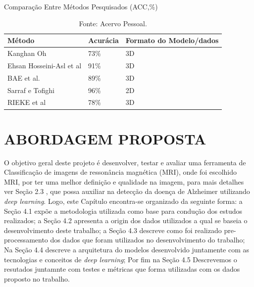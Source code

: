 \documentclass[openright]{UFRGS} %
\begin{document}
\begin{table}[h]
\centering
\caption{Comparação Entre Métodos Pesquisados  (ACC,\%)}
\label{tab:comapreworker}
\begin{tabular}{|l|l|l|}
\hline
\hspace{1cm} \textbf{Método}               & \textbf{Acurácia} & \textbf{Formato do Modelo/dados} \\ \hline
Kanghan Oh               &      73\%             &  \hspace{2cm}  3D                               \\ \hline
Ehsan Hosseini-Asl et al &    91\%                 &  \hspace{2cm}  3D                               \\ \hline
BAE et al.               &   89\%                 & \hspace{2cm}  3D                                \\ \hline
Sarraf e Tofighi         &    96\%               &    \hspace{2cm}  2D                              \\ \hline
RIEKE et al              &      78\%             &  \hspace{2cm}   3D                              \\ \hline
\end{tabular}
\caption{Fonte: Acervo Pessoal.}
\end{table}







\chapter{ABORDAGEM PROPOSTA}

O objetivo geral deste projeto é desenvolver, testar e avaliar uma ferramenta de Classificação de imagens de ressonância magnética (MRI), onde foi escolhido MRI, por ter uma melhor definição e qualidade na imagem, para mais detalhes ver Seção 2.3
, que possa auxiliar na detecção da doença de Alzheimer utilizando  \textit{deep learning}. Logo,
este Capítulo encontra-se organizado da seguinte forma: a Seção 4.1 expõe a metodologia utilizada como base para condução dos estudos realizados; a Seção 4.2 apresenta a  origin dos dados utilizados
a qual se baseia o desenvolvimento deste trabalho; a Seção 4.3 descreve como
foi realizado pre-processamento dos dados que foram utilizados no desenvolvimento do trabalho; Na
Seção 4.4 descreve a arquitetura do modelos desenvolvido juntamente com as tecnologias e conceitos de \textit{deep learning}; Por fim na
Seção 4.5  Descrevemos o resutados juntamnte com testes e métricas que forma utilizadas com os dados proposto no trabalho.
\end{document}
